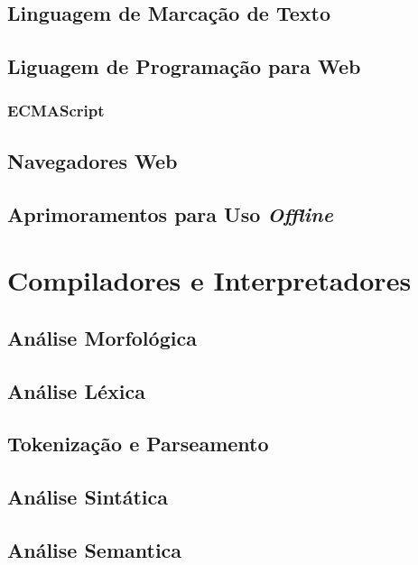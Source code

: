 {\subsection{Linguagem de Marcação de Texto}

\subsection{Liguagem de Programação para Web}

\subsubsection{ECMAScript}

\subsection{Navegadores Web}

\subsection{Aprimoramentos para Uso \textit{Offline}}

\section{Compiladores e Interpretadores}

\subsection{Análise Morfológica}

\subsection{Análise Léxica}

\subsection{Tokenização e Parseamento}

\subsection{Análise Sintática}

\subsection{Análise Semantica}
}
